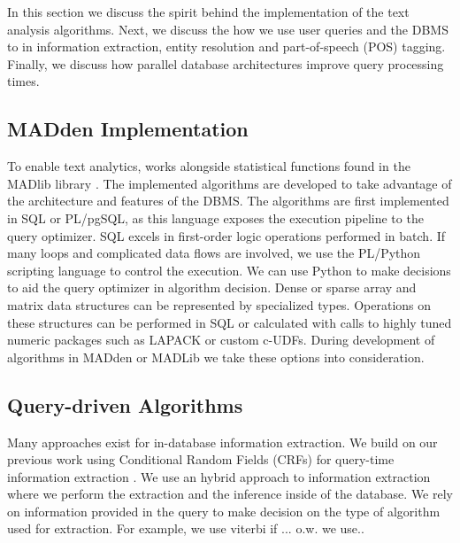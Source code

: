 
In this section we discuss the spirit behind the \system implementation
of the text analysis algorithms. 
Next, we discuss the how we use user queries and the DBMS to in 
information extraction, entity resolution and part-of-speech (POS) tagging.
Finally, we discuss how parallel database architectures improve query 
processing times.






\subsection{MADden Implementation}
To enable text analytics, {\system} works alongside statistical
functions found in the MADlib library \cite{Cohen:2009:MSN:1687553.1687576}.
The implemented algorithms are developed to take advantage of the 
architecture and features of the DBMS.
The algorithms are first implemented in SQL or PL/pgSQL, as this language
exposes the execution pipeline to the query optimizer. 
SQL excels in first-order logic operations performed in batch.
If many loops and complicated data flows are involved, we use the PL/Python 
scripting language to control the execution.
We can use Python to make decisions to aid the query optimizer in algorithm
decision.
Dense or sparse array and matrix data structures can be represented
by specialized types. Operations on these structures can be performed in
SQL or calculated with calls to highly tuned numeric packages such as LAPACK
or custom c-UDFs.
During development of algorithms in MADden or MADLib we take these options 
into consideration.


\subsection{Query-driven Algorithms}


Many approaches exist for in-database information extraction. 
We build on our previous work using Conditional Random Fields (CRFs) for 
query-time information extraction \cite{wang2011hybrid}.
We use an hybrid approach to information extraction where we perform the 
extraction and the inference inside of the database. We rely on information
provided in the query to make decision on the type of algorithm used 
for extraction. For example, we use viterbi if ... o.w. we use.. 

